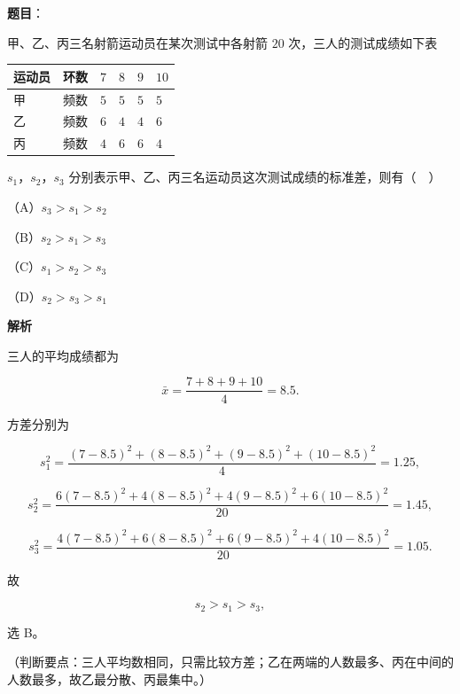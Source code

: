\begin{answer}

\textbf{题目}：

甲、乙、丙三名射箭运动员在某次测试中各射箭 $20$ 次，三人的测试成绩如下表

\begin{center}
\begin{tabular}{llllll}
\toprule
运动员 & 环数 & $7$ & $8$ & $9$ & $10$ \\
\midrule
甲 & 频数 & $5$ & $5$ & $5$ & $5$ \\
乙 & 频数 & $6$ & $4$ & $4$ & $6$ \\
丙 & 频数 & $4$ & $6$ & $6$ & $4$ \\
\bottomrule
\end{tabular}
\end{center}

$s_1$，$s_2$，$s_3$ 分别表示甲、乙、丙三名运动员这次测试成绩的标准差，则有（　）

（A）$s_3>s_1>s_2$

（B）$s_2>s_1>s_3$

（C）$s_1>s_2>s_3$

（D）$s_2>s_3>s_1$

\textbf{解析}

三人的平均成绩都为

\nopagebreak[4]
\[\bar x=\frac{7+8+9+10}{4}=8.5.\]

方差分别为

\nopagebreak[4]
\[s_1^2=\frac{(7-8.5)^2+(8-8.5)^2+(9-8.5)^2+(10-8.5)^2}{4}=1.25,\]

\nopagebreak[4]
\[s_2^2=\frac{6(7-8.5)^2+4(8-8.5)^2+4(9-8.5)^2+6(10-8.5)^2}{20}=1.45,\]

\nopagebreak[4]
\[s_3^2=\frac{4(7-8.5)^2+6(8-8.5)^2+6(9-8.5)^2+4(10-8.5)^2}{20}=1.05.\]

故

\nopagebreak[4]
\[s_2>s_1>s_3,\]

选 B。

（判断要点：三人平均数相同，只需比较方差；乙在两端的人数最多、丙在中间的人数最多，故乙最分散、丙最集中。）


\end{answer}
